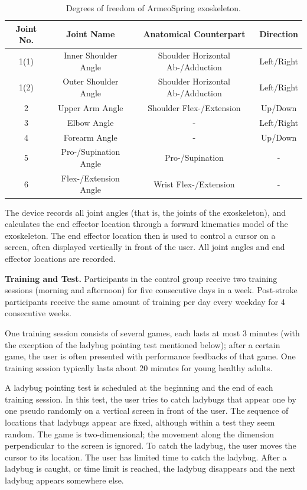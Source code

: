 \begin{table}
	\begin{tabular}{c c c c}
		\hline
		Joint No. & Joint Name & Anatomical Counterpart & Direction \\
		\hline
		1(1) & Inner Shoulder Angle & Shoulder Horizontal Ab-/Adduction & Left/Right \\
		1(2) & Outer Shoulder Angle & Shoulder Horizontal Ab-/Adduction & Left/Right \\
		2 & Upper Arm Angle & Shoulder Flex-/Extension & Up/Down \\
		3 & Elbow Angle & - & Left/Right \\
		4 & Forearm Angle & - & Up/Down \\
		5 & Pro-/Supination Angle & Pro-/Supination & - \\ 
		6 & Flex-/Extension Angle & Wrist Flex-/Extension & - \\
		\hline
	\end{tabular}
	\caption{Degrees of freedom of ArmeoSpring exoskeleton.}
	\label{tab:devicedof}
\end{table}

The device records all joint angles (that is, the joints of the exoskeleton), and calculates the end effector location through a forward kinematics model of the exoskeleton. 
The end effector location then is used to control a cursor on a screen, often displayed vertically in front of the user. 
All joint angles and end effector locations are recorded.

\textbf{Training and Test.}
Participants in the control group receive two training sessions (morning and afternoon) for five consecutive days in a week.
Post-stroke participants receive the same amount of training per day every weekday for 4 consecutive weeks.

One training session consists of several games, each lasts at most 3 minutes (with the exception of the ladybug pointing test mentioned below); after a certain game, the user is often presented with performance feedbacks of that game. 
One training session typically lasts about 20 minutes for young healthy adults.

A ladybug pointing test is scheduled at the beginning and the end of each training session. 
In this test, the user tries to catch ladybugs that appear one by one pseudo randomly on a vertical screen in front of the user. 
The sequence of locations that ladybugs appear are fixed, although within a test they seem random.
The game is two-dimensional; the movement along the dimension perpendicular to the screen is ignored. 
To catch the ladybug, the user moves the cursor to its location. 
The user has limited time to catch the ladybug.
After a ladybug is caught, or time limit is reached, the ladybug disappears and the next ladybug appears somewhere else. 

